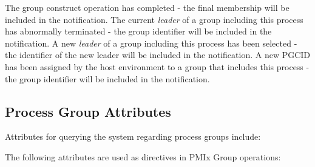 \begin{constantdesc}
%
The group construct operation has completed - the final membership will be included in the notification.
%
The current \emph{leader} of a group including this process has abnormally terminated - the group identifier will be included in the notification.
%
A new \emph{leader} of a group including this process has been selected - the identifier of the new leader will be included in the notification.
%
A new \ac{PGCID} has been assigned by the host environment to a group that includes this process - the group identifier will be included in the notification.
%
\end{constantdesc}

\subsection{Process Group Attributes}

Attributes for querying the system regarding process groups include:

%
%
%
%

\vspace{\baselineskip}
The following attributes are used as directives in \ac{PMIx} Group operations:

